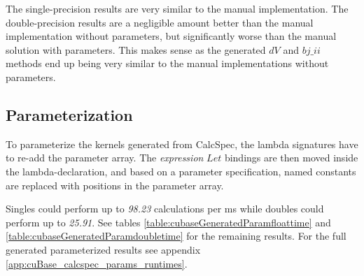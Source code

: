 The single-precision results are very similar to the manual implementation.
The double-precision results are a negligible amount better than the manual implementation without parameters, but significantly worse than the manual solution with parameters.
This makes sense as the generated $dV$ and $bj\_ii$ methods end up being very similar to the manual implementations without parameters.

\subsection{Parameterization}
To parameterize the kernels generated from CalcSpec, the lambda signatures have to re-add the parameter array.
The \emph{expression} $Let$ bindings are then moved inside the lambda-declaration, and based on a parameter specification, named constants are replaced with positions in the parameter array.

Singles could perform up to \emph{98.23} calculations per ms while doubles could perform up to \emph{25.91}.
See tables \ref{table:cubaseGeneratedParamfloattime} and \ref{table:cubaseGeneratedParamdoubletime} for the remaining results.
For the full generated parameterized results see appendix \ref{app:cuBase_calcspec_params_runtimes}.

\begin{table}[h!]
\centering
{}
\caption{CalcSpec generated F\# Alea.cuBase calculations per ms with single precision and parameters\label{table:cubaseGeneratedParamfloattime}}
\end{table}

